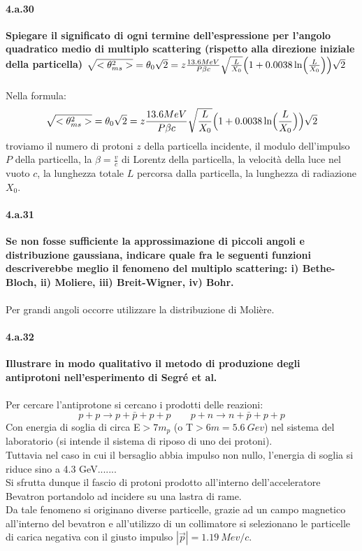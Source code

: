 \documentclass[twoside]{article}
\begin{document}
\paragraph{4.a.30} \textbf{Spiegare il significato di ogni termine dell'espressione per l'angolo quadratico medio di multiplo scattering (rispetto alla direzione iniziale della particella) $\sqrt{<\theta_{ms}^2>}=\theta_0 \sqrt{2}=z \frac{13.6 MeV}{P\beta c} \sqrt{\frac{L}{X_0}} \Bigl( 1+0.0038 \ln \Bigl( \frac{L}{X_0} \Bigr) \Bigr) \sqrt{2}$}\\ \\
Nella formula:
\begin{equation}
\sqrt{<\theta_{ms}^2>}=\theta_0 \sqrt{2}=z \frac{13.6 MeV}{P\beta c} \sqrt{\frac{L}{X_0}} \Bigl( 1+0.0038 \ln \Bigl( \frac{L}{X_0} \Bigr) \Bigr) \sqrt{2}
\end{equation}
troviamo il numero di protoni $z$ della particella incidente, il modulo dell'impulso $P$ della particella, la $\beta=\frac{v}{c}$ di Lorentz della particella, la velocità della luce nel vuoto $c$, la lunghezza totale $L$ percorsa dalla particella, la lunghezza di radiazione $X_0$.

\paragraph{4.a.31}\textbf{Se non fosse sufficiente la approssimazione di piccoli angoli e distribuzione
gaussiana, indicare quale fra le seguenti funzioni descriverebbe meglio il
fenomeno del multiplo scattering: i) Bethe-Bloch, ii) Moliere, iii) Breit-Wigner,
iv) Bohr.}\\ \\
Per grandi angoli occorre utilizzare la distribuzione di Molière.
\paragraph{4.a.32}\textbf{Illustrare in modo qualitativo il metodo di produzione degli antiprotoni
nell’esperimento di Segré et al.}\\ \\
Per cercare l'antiprotone si cercano i prodotti delle reazioni:
\begin{equation}
    p+p\to p+\bar{p}+p+p \qquad p+n\to n+\bar{p}+p+p
\end{equation}
Con energia di soglia di circa E$>7m_p$ (o T$>6m=5.6\ Gev$) nel sistema del laboratorio (si intende il sistema di riposo di uno dei protoni).\\
Tuttavia nel caso in cui il bersaglio abbia impulso non nullo, l’energia di soglia si riduce sino a 
4.3 GeV.......\\
Si sfrutta dunque il fascio di protoni prodotto all'interno dell'acceleratore Bevatron portandolo ad incidere su una lastra di rame.\\
Da tale fenomeno si originano diverse particelle, grazie ad un campo magnetico all'interno del bevatron e all'utilizzo di un collimatore si selezionano le particelle di carica negativa con il giusto impulso $|\vec{p}|=1.19\ Mev/c$.\\
\end{document}
